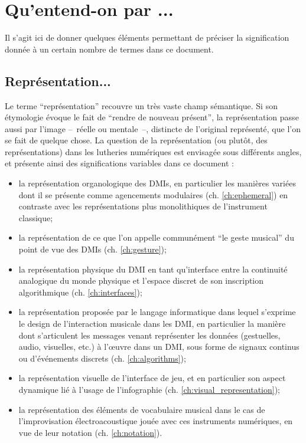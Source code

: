 \section{Qu'entend-on par ...}

\noindent Il s'agit ici de donner quelques éléments permettant de préciser la signification donnée à un certain nombre de termes dans ce document.

\subsection{Représentation...}

\noindent Le terme ``représentation'' recouvre un très vaste champ sémantique. Si son étymologie évoque le fait de ``rendre de nouveau présent'', la représentation passe aussi par l'image --~réelle ou mentale~--, distincte de l'original représenté, que l'on se fait de quelque chose. La question de la représentation (ou plutôt, des représentations) dans les lutheries numériques est envisagée sous différents angles, et présente ainsi des significations variables dans ce document : 
\vspace{-1em}
\begin{itemize}[noitemsep]
\item la représentation organologique des \glspl{DMI}, en particulier les manières variées dont il se présente comme agencements modulaires (ch. \ref{ch:ephemeral}) en contraste avec les représentations plus monolithiques de l'instrument classique;
\item la représentation de ce que l'on appelle communément ``le geste musical'' du point de vue des \glspl{DMI} (ch. \ref{ch:gesture});
\item la représentation physique du \gls{DMI} en tant qu'interface entre la continuité analogique du monde physique et l'espace discret de son inscription algorithmique (ch. \ref{ch:interfaces});
\item la représentation proposée par le langage informatique dans lequel s'exprime le design de l'interaction musicale dans les \gls{DMI}, en particulier la manière dont s'articulent les messages venant représenter les données (gestuelles, audio, visuelles, etc.) à l'œuvre dans un \gls{DMI}, sous forme de signaux continus ou d'événements discrets (ch. \ref{ch:algorithms});
\item la représentation visuelle de l'interface de jeu, et en particulier son aspect dynamique lié à l'usage de l'infographie (ch. \ref{ch:visual_representation});
\item la représentation des éléments de vocabulaire musical dans le cas de l'improvisation électroacoustique jouée avec ces instruments numériques, en vue de leur notation (ch. \ref{ch:notation}).
\end{itemize}


